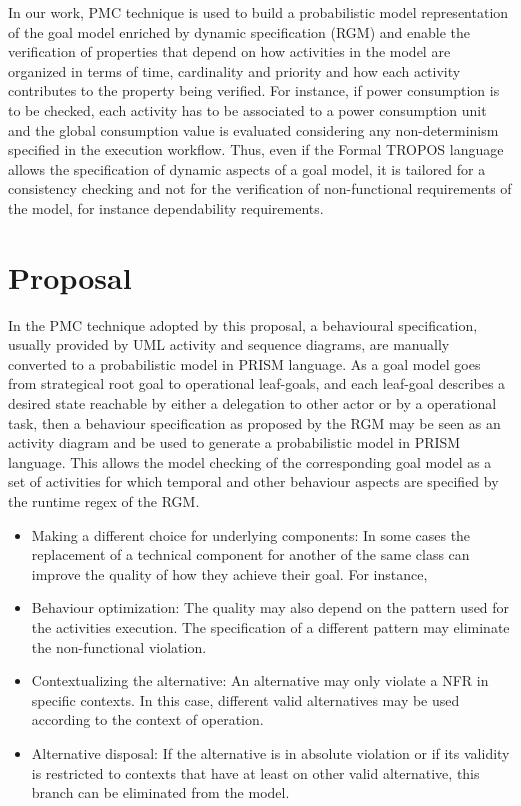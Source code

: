 In our work, PMC technique is used to build a probabilistic model representation of the goal model enriched by dynamic specification (RGM) and enable the verification of properties that depend on how activities in the model are organized in terms of time, cardinality and priority and how each activity contributes to the property being verified. For instance, if power consumption is to be checked, each activity has to be associated to a power consumption unit and the global consumption value is evaluated considering any non-determinism specified in the execution workflow. Thus, even if the Formal TROPOS language allows the specification of dynamic aspects of a goal model, it is tailored for a consistency checking and not for the verification of non-functional requirements of the model, for instance dependability requirements.

\chapter{Proposal}\label{ch_proposal}

In the PMC technique adopted by this proposal, a behavioural specification, usually provided by UML activity and sequence diagrams, are manually converted to a probabilistic model in PRISM language. As a goal model goes from strategical root goal to operational leaf-goals, and each leaf-goal describes a desired state reachable by either a delegation to other actor or by a operational task, then a behaviour specification as proposed by the RGM may be seen as an activity diagram and be used to generate a probabilistic model in PRISM language. This allows the model checking of the corresponding goal model as a set of activities for which temporal and other behaviour aspects are specified by the runtime regex of the RGM.


\begin{itemize}

\item Making a different choice for underlying components: In some cases the replacement of a technical component for another of the same class can improve the quality of how they achieve their goal. For instance,
\medskip

\item Behaviour optimization: The quality may also depend on the pattern used for the activities execution. The specification of a different pattern may eliminate the non-functional violation. 
\medskip

\item Contextualizing the alternative: An alternative may only violate a NFR in specific contexts. In this case, different valid alternatives may be used according to the context of operation.
\medskip

\item Alternative disposal: If the alternative is in absolute violation or if its validity is restricted to contexts that have at least on other valid alternative, this branch can be eliminated from the model.

\end{itemize}
